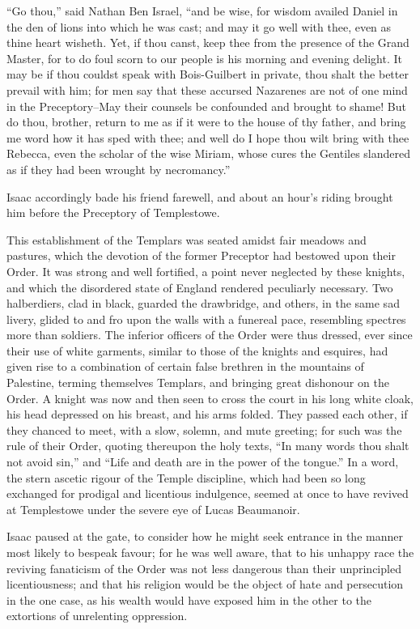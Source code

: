 ``Go thou,'' said Nathan Ben Israel, ``and be wise, for wisdom availed
Daniel in the den of lions into which he was cast; and may it go well
with thee, even as thine heart wisheth. Yet, if thou canst, keep thee
from the presence of the Grand Master, for to do foul scorn to our
people is his morning and evening delight. It may be if thou couldst
speak with Bois-Guilbert in private, thou shalt the better prevail with
him; for men say that these accursed Nazarenes are not of one mind in
the Preceptory--May their counsels be confounded and brought to shame!
But do thou, brother, return to me as if it were to the house of thy
father, and bring me word how it has sped with thee; and well do I hope
thou wilt bring with thee Rebecca, even the scholar of the wise Miriam,
whose cures the Gentiles slandered as if they had been wrought by
necromancy.''

Isaac accordingly bade his friend farewell, and about an hour's riding
brought him before the Preceptory of Templestowe.

This establishment of the Templars was seated amidst fair meadows and
pastures, which the devotion of the former Preceptor had bestowed upon
their Order. It was strong and well fortified, a point never neglected
by these knights, and which the disordered state of England rendered
peculiarly necessary. Two halberdiers, clad in black, guarded the
drawbridge, and others, in the same sad livery, glided to and fro upon
the walls with a funereal pace, resembling spectres more than soldiers.
The inferior officers of the Order were thus dressed, ever since their
use of white garments, similar to those of the knights and esquires, had
given rise to a combination of certain false brethren in the mountains
of Palestine, terming themselves Templars, and bringing great dishonour
on the Order. A knight was now and then seen to cross the court in his
long white cloak, his head depressed on his breast, and his arms folded.
They passed each other, if they chanced to meet, with a slow, solemn,
and mute greeting; for such was the rule of their Order, quoting
thereupon the holy texts, ``In many words thou shalt not avoid sin,''
and ``Life and death are in the power of the tongue.'' In a word, the
stern ascetic rigour of the Temple discipline, which had been so long
exchanged for prodigal and licentious indulgence, seemed at once to have
revived at Templestowe under the severe eye of Lucas Beaumanoir.

Isaac paused at the gate, to consider how he might seek entrance in the
manner most likely to bespeak favour; for he was well aware, that to his
unhappy race the reviving fanaticism of the Order was not less dangerous
than their unprincipled licentiousness; and that his religion would be
the object of hate and persecution in the one case, as his wealth would
have exposed him in the other to the extortions of unrelenting
oppression.

